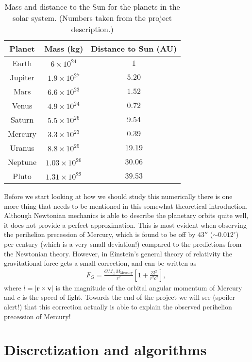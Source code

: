 \documentclass[12pt, a4paper]{article}
\begin{document}
\begin{table}
\caption{Mass and distance to the Sun for the planets in the solar system. (Numbers taken from the 
project description.)}
\label{tab:planets}
\begin{center}
\begin{tabular}{ccc} \hline\hline
Planet & Mass (kg) & Distance to Sun (AU) \\ \hline 
Earth & $6\times10^{24}$ & $1$  \\
Jupiter & $1.9\times10^{27}$ & $5.20$  \\
Mars & $6.6\times10^{23}$ & $1.52$ \\
Venus & $4.9\times10^{24}$ & $0.72$ \\
Saturn & $5.5\times10^{26}$ & $9.54$ \\ 
Mercury & $3.3\times10^{23}$ & $0.39$ \\ 
Uranus & $8.8\times10^{25}$ & $19.19$ \\ 
Neptune & $1.03\times10^{26}$ & $30.06$  \\ 
Pluto & $1.31\times10^{22}$ & $39.53$ \\ \hline \hline
\end{tabular}
\end{center}
\end{table}

Before we start looking at how we should study this numerically there is one more thing that needs to 
be mentioned in this somewhat theoretical introduction. Although Newtonian mechanics is able to describe 
the planetary orbits quite well, it does not provide a perfect approximation. This is most evident when 
observing the perihelion precession of Mercury, which is found to be off by $43''$ ($\sim 0.012^{\circ}$)
per century (which is a very small deviation!) compared to the predictions from the Newtonian theory.
However, in Einstein's general theory of relativity the gravitational force gets a small correction, 
and can be written as 
\begin{align*}
F_G = \frac{GM_{\odot}M_{\text{Mercury}}}{r^2}\left[ 1+ \frac{3l^2}{r^2c^2} \right], 
\end{align*} 
where $l=|\mathbf{r}\times \mathbf{v}|$ is the magnitude of the orbital angular momentum of Mercury and 
$c$ is the speed of light. Towards the end of the project we will see (spoiler alert!) that this 
correction actually is able to explain the observed perihelion precession of Mercury!  

\section{Discretization and algorithms}
\end{document}
